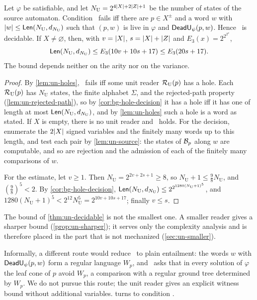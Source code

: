 \begin{theorem}\label{thm:un-decidable}
Let $\varphi$ be satisfiable, and let $N_{\mathrm U}=2^{4\lvert X\rvert+2\lvert Z\rvert+1}$ be
the number of states of the source automaton. Condition \CondU\ fails iff
there are $p\in X^\pm$ and a word $w$ with
$\lvert w\rvert\le\mathsf{Len}(N_{\mathrm U},d_{N_{\mathrm U}})$ such that $(p,w)$ is
live in $\varphi$ and $\mathsf{DeadU}_\psi(p,w)$. Hence \CondU\ is decidable. If
$X\ne\varnothing$, then, with $v=\lvert X\rvert$, $s=\lvert X\rvert+\lvert Z\rvert$ and
$E_3(x)=2^{2^{2^x}}$,
\[
 \mathsf{Len}(N_{\mathrm U},d_{N_{\mathrm U}})\le E_3(10v+10s+17)\le E_3(20s+17).
\]
The bound depends neither on the arity nor on the variance.
\end{theorem}

\begin{proof}
By \cref{lem:un-holes}, \CondU\ fails iff some unit reader $\mathcal R_{\mathrm U}(p)$ has a
hole. Each $\mathcal R_{\mathrm U}(p)$ has $N_{\mathrm U}$ states, the finite alphabet $\Sigma$,
and the rejected-path property (\cref{lem:un-rejected-path}), so by
\cref{cor:bg-hole-decision} it has a hole iff it has one of length at most
$\mathsf{Len}(N_{\mathrm U},d_{N_{\mathrm U}})$, and by \cref{lem:un-holes} such
a hole is a word as stated. If $X$ is empty, there is no unit reader and
\CondU\ holds. For the decision, enumerate the $2\lvert X\rvert$ signed variables and
the finitely many words up to this length, and test each pair by
\cref{lem:un-source}: the states of $\mathcal B_p$ along $w$ are computable, and so
are rejection and the admission of each of the finitely many comparisons of
$w$.

For the estimate, let $v\ge1$. Then $N_{\mathrm U}=2^{2v+2s+1}\ge8$, so
$N_{\mathrm U}+1\le\frac98N_{\mathrm U}$, and $(\frac98)^5<2$. By
\cref{cor:bg-hole-decision}, $\mathsf{Len}(N_{\mathrm U},d_{N_{\mathrm U}})\le
2^{2^{1280(N_{\mathrm U}+1)^5}}$, and
$1280(N_{\mathrm U}+1)^5<2^{12}N_{\mathrm U}^5=2^{10v+10s+17}$; finally
$v\le s$.
\end{proof}

The bound of \cref{thm:un-decidable} is not the smallest one. A smaller reader
gives a sharper bound (\cref{prop:un-sharper}); it serves only the complexity
analysis and is therefore placed in the part that is not mechanized
(\cref{sec:un-smaller}).

Informally, a different route would reduce \CondU\ to plain entailment: the
words $w$ with $\mathsf{DeadU}_\psi(p,w)$ form a regular language $W_p$, and \CondU\
asks that in every solution of $\varphi$ the leaf cone of $p$ avoid $W_p$, a
comparison with a regular ground tree determined by $W_p$. We do not pursue
this route; the unit reader gives an explicit witness bound without additional
variables. \Cref{sec:ex} turns to condition \CondII.
